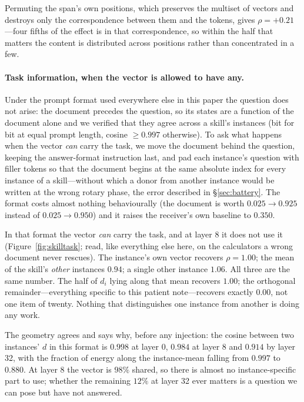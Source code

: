 \documentclass{article}
\newcommand{\dvec}{\ensuremath{d}}
\begin{document}
Permuting the span's own positions, which preserves the multiset of vectors and
destroys only the correspondence between them and the tokens, gives
$\rho = +0.21$---four fifths of the effect is in that correspondence, so within
the half that matters the content is distributed across positions rather than
concentrated in a few.



\paragraph{Task information, when the vector is allowed to have any.} Under the
prompt format used everywhere else in this paper the question does not arise:
the document precedes the question, so its states are a function of the document
alone and we verified that they agree across a skill's instances (bit for bit at
equal prompt length, cosine $\ge 0.997$ otherwise).
To ask what happens when the vector \emph{can} carry the task, we move the
document behind the question, keeping the answer-format instruction last, and
pad each instance's question with filler tokens so that the document begins at
the same absolute index for every instance of a skill---without which a donor
from another instance would be written at the wrong rotary phase, the error
described in \S\ref{sec:battery}. The format costs almost nothing behaviourally
(the document is worth $0.025 \to 0.925$ instead of $0.025 \to 0.950$) and it
raises the receiver's own baseline to $0.350$.

In that format the vector \emph{can} carry the task, and at layer 8 it does not
use it (Figure~\ref{fig:skilltask}; read, like everything else here, on the
calculators a wrong document never rescues). The instance's own vector recovers
$\rho = 1.00$; the mean of the skill's \emph{other} instances $0.94$; a single
other instance $1.06$. All three are the same number. The half of $\dvec_i$
lying along that mean recovers $1.00$; the orthogonal remainder---everything
specific to this patient note---recovers exactly $0.00$, not one item of twenty.
Nothing that distinguishes one instance from another is doing any work.

The geometry agrees and says why, before any injection: the cosine between two
instances' $\dvec$ in this format is $0.998$ at layer 0, $0.984$ at layer 8 and
$0.914$ by layer 32, with the fraction of energy along the instance-mean falling
from $0.997$ to $0.880$. At layer 8 the vector is $98\%$ shared, so there is
almost no instance-specific part to use; whether the remaining $12\%$ at layer 32
ever matters is a question we can pose but have not answered.
\end{document}
